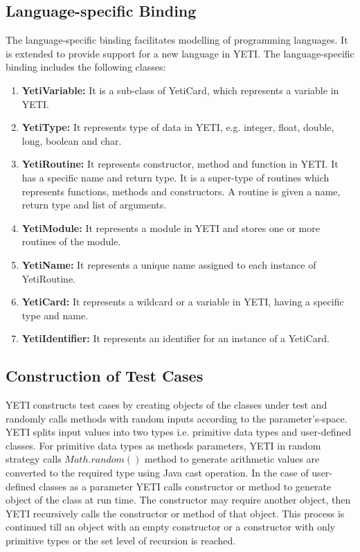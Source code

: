 \subsection{Language-specific Binding}
The language-specific binding facilitates modelling of programming languages. It is extended to provide support for a new language in YETI. The language-specific binding includes the following classes:
\begin{enumerate}
\item {\textbf{YetiVariable:}} It is a sub-class of YetiCard, which represents a variable in YETI.
\item {\textbf{YetiType:}} It represents type of data in YETI, e.g. integer, float, double, long, boolean and char.
\item {\textbf{YetiRoutine:}} It represents constructor, method and function in YETI. It has a specific name and return type. It is a super-type of routines which represents functions, methods and constructors. A routine is given a name, return type and list of arguments.
\item {\textbf{YetiModule:}} It represents a module in YETI and stores one or more routines of the module.
\item {\textbf{YetiName:}} It represents a unique name assigned to each instance of YetiRoutine.
\item {\textbf{YetiCard:}} It represents a wildcard or a variable in YETI, having a specific type and name.
\item {\textbf{YetiIdentifier:}} It represents an identifier for an instance of a YetiCard.
\end{enumerate}

\subsection{Construction of Test Cases} \label{sec:constructionOfTestCases}
YETI constructs test cases by creating objects of the classes under test and randomly calls methods with random inputs according to the parameter's-space. YETI splits input values into two types i.e. primitive data types and user-defined classes. For primitive data types as methods parameters, YETI in random strategy calls $Math.random()$ method to generate arithmetic values are converted to the required type using Java cast operation. In the case of user-defined classes as a parameter YETI calls constructor or method to generate object of the class at run time. The constructor may require another object, then YETI recursively calls the constructor or method of that object. This process is continued till an object with an empty constructor or a constructor with only primitive types or the set level of recursion is reached.

